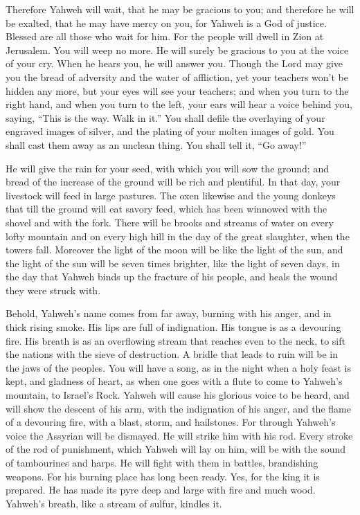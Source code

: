 {\par }{\PP {}Therefore Yahweh will wait, that he may be gracious to you; and therefore he will be exalted, that he may have mercy on you, for Yahweh is a God of justice. Blessed are all those who wait for him.
For the people will dwell in Zion at Jerusalem. You will weep no more. He will surely be gracious to you at the voice of your cry. When he hears you, he will answer you.
Though the Lord may give you the bread of adversity and the water of affliction, yet your teachers won’t be hidden any more, but your eyes will see your teachers;
and when you turn to the right hand, and when you turn to the left, your ears will hear a voice behind you, saying, “This is the way. Walk in it.”
You shall defile the overlaying of your engraved images of silver, and the plating of your molten images of gold. You shall cast them away as an unclean thing. You shall tell it, “Go away!”
\par }{\PP {}He will give the rain for your seed, with which you will sow the ground; and bread of the increase of the ground will be rich and plentiful. In that day, your livestock will feed in large pastures.
The oxen likewise and the young donkeys that till the ground will eat savory feed, which has been winnowed with the shovel and with the fork.
There will be brooks and streams of water on every lofty mountain and on every high hill in the day of the great slaughter, when the towers fall.
Moreover the light of the moon will be like the light of the sun, and the light of the sun will be seven times brighter, like the light of seven days, in the day that Yahweh binds up the fracture of his people, and heals the wound they were struck with.
\par }{\PP {}Behold, Yahweh’s name comes from far away, burning with his anger, and in thick rising smoke. His lips are full of indignation. His tongue is as a devouring fire.
His breath is as an overflowing stream that reaches even to the neck, to sift the nations with the sieve of destruction. A bridle that leads to ruin will be in the jaws of the peoples.
You will have a song, as in the night when a holy feast is kept, and gladness of heart, as when one goes with a flute to come to Yahweh’s mountain, to Israel’s Rock.
Yahweh will cause his glorious voice to be heard, and will show the descent of his arm, with the indignation of his anger, and the flame of a devouring fire, with a blast, storm, and hailstones.
For through Yahweh’s voice the Assyrian will be dismayed. He will strike him with his rod.
Every stroke of the rod of punishment, which Yahweh will lay on him, will be with the sound of tambourines and harps. He will fight with them in battles, brandishing weapons.
For his burning place has long been ready. Yes, for the king it is prepared. He has made its pyre deep and large with fire and much wood. Yahweh’s breath, like a stream of sulfur, kindles it.

}
